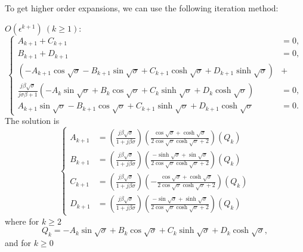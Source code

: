 \documentclass{article}
\begin{document}
To get higher order expansions, we can use the following iteration method:

\noindent
$O(\epsilon^{k+1})\ (k\geq 1)$:
\begin{equation}
    \left\{\begin{aligned}
        A_{k+1} + C_{k+1} &= 0, \\
        B_{k+1} + D_{k+1} &= 0, \\
        \left( - A_{k+1} \cos{\sqrt{\sigma}} - B_{k+1} \sin{\sqrt{\sigma}} + C_{k+1} \cosh{\sqrt{\sigma}} + D_{k+1} \sinh{\sqrt{\sigma}} \right) &+ \\
        \frac{j \beta \sqrt{\sigma}}{ j\sigma \beta + 1 } \left( - A_{k} \sin{\sqrt{\sigma}} + B_{k} \cos{\sqrt{\sigma}} + C_{k} \sinh{\sqrt{\sigma}} + D_{k} \cosh{\sqrt{\sigma}} \right) &= 0, \\
        A_{k+1} \sin{\sqrt{\sigma}} - B_{k+1} \cos{\sqrt{\sigma}} + C_{k+1} \sinh{\sqrt{\sigma}} + D_{k+1} \cosh{\sqrt{\sigma}} &= 0.
    \end{aligned}\right.
\end{equation}
The solution is
\begin{equation}
    \left\{\begin{aligned}
        A_{k+1} &= \left( \frac{j \beta \sqrt{\sigma }}{1+j \beta \sigma } \right) \left(\frac{\cos\sqrt{\sigma }+\cosh\sqrt{\sigma }}{2 \cos\sqrt{\sigma }\cosh\sqrt{\sigma }+2} \right) \left( Q_k \right) \\
        B_{k+1} &= \left( \frac{j \beta \sqrt{\sigma }}{1+j \beta \sigma } \right) \left( \frac{-\sinh\sqrt{\sigma }+\sin\sqrt{\sigma }}{2 \cos\sqrt{\sigma }\cosh\sqrt{\sigma }+2} \right) \left( Q_k \right) \\
        C_{k+1} &= \left( \frac{j \beta \sqrt{\sigma }}{1+j \beta \sigma } \right) \left( -\frac{\cos\sqrt{\sigma }+\cosh\sqrt{\sigma }}{2 \cos\sqrt{\sigma } \cosh\sqrt{\sigma }+2} \right) \left( Q_k \right) \\
        D_{k+1} &= \left( \frac{j \beta \sqrt{\sigma }}{1+j \beta \sigma } \right) \left( \frac{-\sin\sqrt{\sigma }+\sinh\sqrt{\sigma }}{2 \cos\sqrt{\sigma }\cosh\sqrt{\sigma }+2} \right) \left( Q_k \right) 
    \end{aligned}\right.
\end{equation}
where for $k \geq 2$
\begin{equation}
    Q_k = - A_{k} \sin{\sqrt{\sigma}} + B_{k} \cos{\sqrt{\sigma}} + C_{k} \sinh{\sqrt{\sigma}} + D_{k} \cosh{\sqrt{\sigma}},
\end{equation}
and for $k \geq 0$
\end{document}
